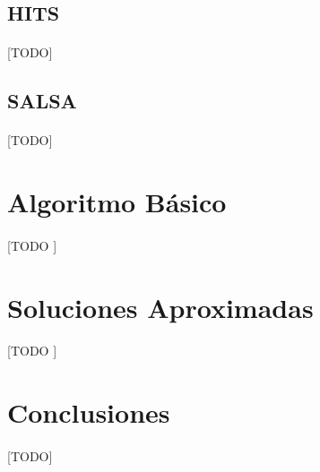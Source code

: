 \documentclass{subfiles}
\begin{document}
      \subsection{HITS}
      \label{sec:hits}

        \paragraph{}
        [TODO]

      \subsection{SALSA}
      \label{sec:salsa}

        \paragraph{}
        [TODO]

    \section{Algoritmo Básico}
    \label{sec:pagerank_algorithm}

      \paragraph{}
      [TODO ]

    \section{Soluciones Aproximadas}
    \label{sec:pagerank_algorithm_approximated}

      \paragraph{}
      [TODO ]

    \section{Conclusiones}
    \label{sec:pagerank_conclusions}

      \paragraph{}
      [TODO]
\end{document}
